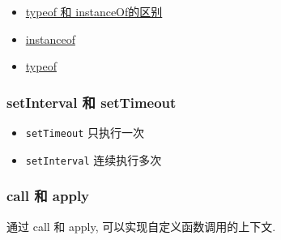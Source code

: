 \begin{itemize}
\tightlist
\item
  \href{http://segmentfault.com/a/1190000000730982}{typeof 和
  instanceOf的区别}
\item
  \href{https://developer.mozilla.org/zh-CN/docs/Web/JavaScript/Reference/Operators/instanceof}{instanceof}
\item
  \href{https://developer.mozilla.org/zh-CN/docs/Web/JavaScript/Reference/Operators/typeof}{typeof}
\end{itemize}

\subsubsection{setInterval 和
setTimeout}\label{setinterval-ux548c-settimeout}

\begin{itemize}
\tightlist
\item
  \lstinline!setTimeout! 只执行一次
\item
  \lstinline!setInterval! 连续执行多次
\end{itemize}

\subsubsection{call 和 apply}\label{call-ux548c-apply}

通过 call 和 apply, 可以实现自定义函数调用的上下文.


